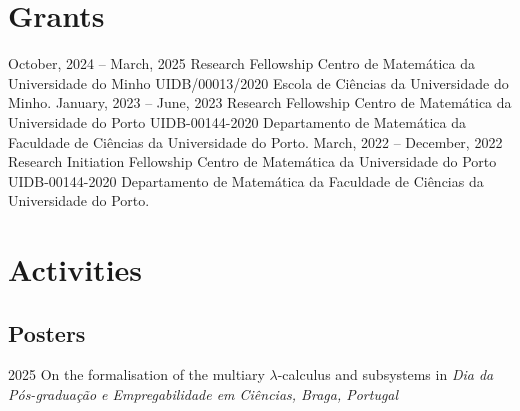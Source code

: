 \documentclass[11pt,a4paper]{moderncv}
\begin{document}
\section{Grants}
\cventry
	{October, 2024 -- March, 2025}
	{Research Fellowship}
	{Centro de Matemática da Universidade do Minho}{}
	{UIDB/00013/2020}
	{Escola de Ciências da Universidade do Minho.}
\cventry
	{January, 2023 -- June, 2023}
	{Research Fellowship}
	{Centro de Matemática da Universidade do Porto}{}
	{UIDB-00144-2020}
	{Departamento de Matemática da Faculdade de Ciências da Universidade do Porto.}
\cventry
	{March, 2022 -- December, 2022}
	{Research Initiation Fellowship}
	{Centro de Matemática da Universidade do Porto}{}
	{UIDB-00144-2020}
	{Departamento de Matemática da Faculdade de Ciências da Universidade do Porto.}






        

\section{Activities}

\subsection{Posters}
\cventry
	{2025}
	{On the formalisation of the multiary $\lambda$-calculus and subsystems}{}
	{in \textit{Dia da Pós-graduação e Empregabilidade em Ciências, Braga, Portugal}}{}{}
\end{document}
